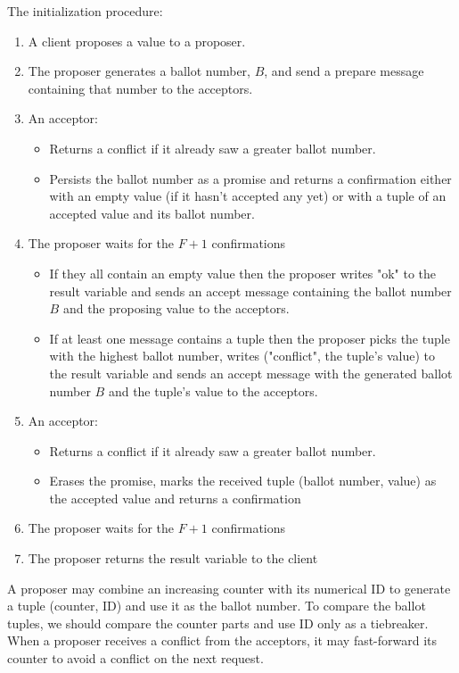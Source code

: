 \documentclass[12pt]{article}
\begin{document}
The initialization procedure:
\begin{enumerate}
  \item A client proposes a value to a proposer.
  \item The proposer generates a ballot number, $B$, and send a prepare message containing that number to the acceptors.
  \item An acceptor:
  \begin{itemize}
    \item Returns a conflict if it already saw a greater ballot number.
    \item Persists the ballot number as a promise and returns a confirmation either with an empty value (if it hasn't accepted any yet) or with a tuple of an accepted value and its ballot number.
  \end{itemize}
  \item The proposer waits for the $F+1$ confirmations
  \begin{itemize}
    \item If they all contain an empty value then the proposer writes "ok" to the result variable and sends an accept message containing the ballot number $B$ and the proposing value to the acceptors.
    \item If at least one message contains a tuple then the proposer picks the tuple with the highest ballot number, writes ("conflict", the tuple's value) to the result variable and sends an accept message with the generated ballot number $B$ and the tuple's value to the acceptors.
  \end{itemize}
  \item An acceptor:
  \begin{itemize}
    \item Returns a conflict if it already saw a greater ballot number.
    \item Erases the promise, marks the received tuple (ballot number, value) as the accepted value and returns a confirmation
  \end{itemize}
  \item The proposer waits for the $F+1$ confirmations
  \item The proposer returns the result variable to the client
\end{enumerate}

A proposer may combine an increasing counter with its numerical ID to generate a tuple (counter, ID) and use it as the ballot number. To compare the ballot tuples, we should compare the counter parts and use ID only as a tiebreaker. When a proposer receives a conflict from the acceptors, it may fast-forward its counter to avoid a conflict on the next request.
\end{document}
